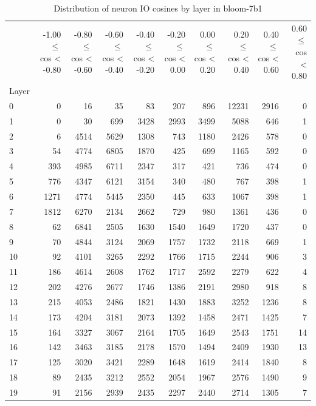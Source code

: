 \begin{table}
\caption{Distribution of neuron IO cosines by layer in bloom-7b1}
\label{tab:bloom-7b1_half_coarse}
\begin{tabular}{lrrrrrrrrr}
 & -1.00 $\leq$ cos < -0.80 & -0.80 $\leq$ cos < -0.60 & -0.60 $\leq$ cos < -0.40 & -0.40 $\leq$ cos < -0.20 & -0.20 $\leq$ cos < 0.00 & 0.00 $\leq$ cos < 0.20 & 0.20 $\leq$ cos < 0.40 & 0.40 $\leq$ cos < 0.60 & 0.60 $\leq$ cos < 0.80 \\
Layer &  &  &  &  &  &  &  &  &  \\
0 & 0 & 16 & 35 & 83 & 207 & 896 & 12231 & 2916 & 0 \\
1 & 0 & 30 & 699 & 3428 & 2993 & 3499 & 5088 & 646 & 1 \\
2 & 6 & 4514 & 5629 & 1308 & 743 & 1180 & 2426 & 578 & 0 \\
3 & 54 & 4774 & 6805 & 1870 & 425 & 699 & 1165 & 592 & 0 \\
4 & 393 & 4985 & 6711 & 2347 & 317 & 421 & 736 & 474 & 0 \\
5 & 776 & 4347 & 6121 & 3154 & 340 & 480 & 767 & 398 & 1 \\
6 & 1271 & 4774 & 5445 & 2350 & 445 & 633 & 1067 & 398 & 1 \\
7 & 1812 & 6270 & 2134 & 2662 & 729 & 980 & 1361 & 436 & 0 \\
8 & 62 & 6841 & 2505 & 1630 & 1540 & 1649 & 1720 & 437 & 0 \\
9 & 70 & 4844 & 3124 & 2069 & 1757 & 1732 & 2118 & 669 & 1 \\
10 & 92 & 4101 & 3265 & 2292 & 1766 & 1715 & 2244 & 906 & 3 \\
11 & 186 & 4614 & 2608 & 1762 & 1717 & 2592 & 2279 & 622 & 4 \\
12 & 202 & 4276 & 2677 & 1746 & 1386 & 2191 & 2980 & 918 & 8 \\
13 & 215 & 4053 & 2486 & 1821 & 1430 & 1883 & 3252 & 1236 & 8 \\
14 & 173 & 4204 & 3181 & 2073 & 1392 & 1458 & 2471 & 1425 & 7 \\
15 & 164 & 3327 & 3067 & 2164 & 1705 & 1649 & 2543 & 1751 & 14 \\
16 & 142 & 3463 & 3185 & 2178 & 1570 & 1494 & 2409 & 1930 & 13 \\
17 & 125 & 3020 & 3421 & 2289 & 1648 & 1619 & 2414 & 1840 & 8 \\
18 & 89 & 2435 & 3212 & 2552 & 2054 & 1967 & 2576 & 1490 & 9 \\
19 & 91 & 2156 & 2939 & 2435 & 2297 & 2440 & 2714 & 1305 & 7 \\

\end{tabular}
\end{table}
